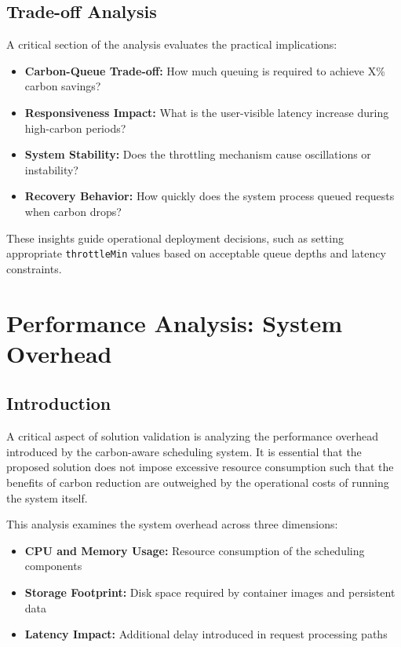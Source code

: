 \subsection{Trade-off Analysis}

A critical section of the analysis evaluates the practical implications:

\begin{itemize}
    \item \textbf{Carbon-Queue Trade-off:} How much queuing is required to achieve X\% carbon savings?
    \item \textbf{Responsiveness Impact:} What is the user-visible latency increase during high-carbon periods?
    \item \textbf{System Stability:} Does the throttling mechanism cause oscillations or instability?
    \item \textbf{Recovery Behavior:} How quickly does the system process queued requests when carbon drops?
\end{itemize}

These insights guide operational deployment decisions, such as setting appropriate \texttt{throttleMin} values based on acceptable queue depths and latency constraints.

\section{Performance Analysis: System Overhead}\label{sect:overhead-analysis}

\subsection{Introduction}

A critical aspect of solution validation is analyzing the performance overhead introduced by the carbon-aware scheduling system. It is essential that the proposed solution does not impose excessive resource consumption such that the benefits of carbon reduction are outweighed by the operational costs of running the system itself.

This analysis examines the system overhead across three dimensions:

\begin{itemize}
    \item \textbf{CPU and Memory Usage:} Resource consumption of the scheduling components
    \item \textbf{Storage Footprint:} Disk space required by container images and persistent data
    \item \textbf{Latency Impact:} Additional delay introduced in request processing paths
\end{itemize}

